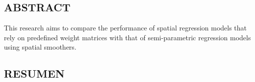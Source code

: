 



\vspace*{0.5in}
\begin{center}
\section*{ABSTRACT}
\end{center}

\noindent
	This research aims to compare the performance of spatial regression models that rely on predefined
	weight matrices with that of semi-parametric regression models using spatial smoothers.







\newpage





\vspace*{0.5in}
\begin{center}
\section*{RESUMEN}
\end{center}

\noindent
\blindtext %
